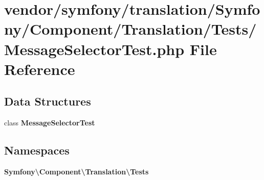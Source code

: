 \section{vendor/symfony/translation/\+Symfony/\+Component/\+Translation/\+Tests/\+Message\+Selector\+Test.php File Reference}
\label{_message_selector_test_8php}
\subsection*{Data Structures}
\begin{DoxyCompactItemize}
\item 
class {\bf Message\+Selector\+Test}
\end{DoxyCompactItemize}
\subsection*{Namespaces}
\begin{DoxyCompactItemize}
\item 
 {\bf Symfony\textbackslash{}\+Component\textbackslash{}\+Translation\textbackslash{}\+Tests}
\end{DoxyCompactItemize}
